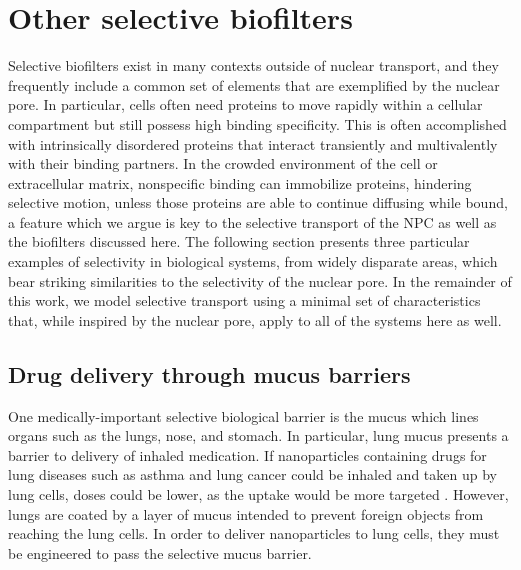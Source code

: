 \section{Other selective biofilters}
\label{sec:other-systems}

Selective biofilters exist in many contexts outside of nuclear transport, and they frequently include a common set of elements that are exemplified by the nuclear pore.  In particular, cells often need proteins to move rapidly within a cellular compartment but still possess high binding specificity.  This is often accomplished with intrinsically disordered proteins that interact transiently and multivalently with their binding partners.  In the crowded environment of the cell or extracellular matrix, nonspecific binding can immobilize proteins, hindering selective motion, unless those proteins are able to continue diffusing while bound, a feature which we argue is key to the selective transport of the NPC as well as the biofilters discussed here. The following section presents three particular examples of selectivity in biological systems, from widely disparate areas, which bear striking similarities to the selectivity of the nuclear pore.  In the remainder of this work, we model selective transport using a minimal set of characteristics that, while inspired by the nuclear pore, apply to all of the systems here as well.

\subsection{Drug delivery through mucus barriers}

One medically-important selective biological barrier is the mucus which lines organs such as the lungs, nose, and stomach.  In particular, lung mucus presents a barrier to delivery of inhaled medication.  If nanoparticles containing drugs for lung diseases such as asthma and lung cancer could be inhaled and taken up by lung cells, doses could be lower, as the uptake would be more targeted \cite{carlson18,schneider17}.  However, lungs are coated by a layer of mucus intended to prevent foreign objects from reaching the lung cells.  In order to deliver nanoparticles to lung cells, they must be engineered to pass the selective mucus barrier.

